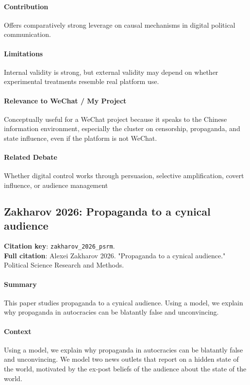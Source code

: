 \documentclass[12pt]{article}
\begin{document}
\paragraph{Contribution} Offers comparatively strong leverage on causal mechanisms in digital political communication.

\paragraph{Limitations} Internal validity is strong, but external validity may depend on whether experimental treatments resemble real platform use.

\paragraph{Relevance to WeChat / My Project} Conceptually useful for a WeChat project because it speaks to the Chinese information environment, especially the cluster on censorship, propaganda, and state influence, even if the platform is not WeChat.

\paragraph{Related Debate} Whether digital control works through persuasion, selective amplification, covert influence, or audience management


\subsection{Zakharov 2026: Propaganda to a cynical audience}
\textbf{Citation key}: \texttt{zakharov\_2026\_psrm}.\\
\textbf{Full citation}: Alexei Zakharov 2026. "Propaganda to a cynical audience." Political Science Research and Methods.

\paragraph{Summary} This paper studies propaganda to a cynical audience. Using a model, we explain why propaganda in autocracies can be blatantly false and unconvincing.

\paragraph{Context} Using a model, we explain why propaganda in autocracies can be blatantly false and unconvincing. We model two news outlets that report on a hidden state of the world, motivated by the ex-post beliefs of the audience about the state of the world.
\end{document}
